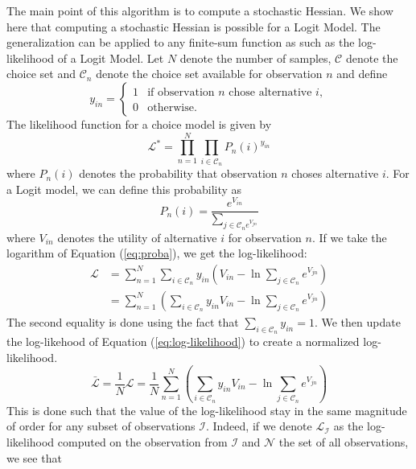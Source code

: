 \documentclass[conference]{IEEEtran}
\begin{document}
The main point of this algorithm is to compute a stochastic Hessian. We show here that computing a stochastic Hessian is possible for a Logit Model. The generalization can be applied to any finite-sum function as such as the log-likelihood of a Logit Model. Let $N$ denote the number of samples, $\mathcal{C}$ denote the choice set and $\mathcal{C}_n$ denote the choice set available for observation $n$ and define
\[
y_{in} = 
\begin{cases}
1 & \text{if observation $n$ chose alternative $i$}, \\
0 & \text{otherwise}.
\end{cases}
\]
The likelihood function for a choice model is given by
\begin{equation}
\mathcal{L}^* = \prod_{n=1}^N \prod_{i\in\mathcal{C}_n} P_n(i)^{y_{in}}
\end{equation}
where $P_n(i)$ denotes the probability that observation $n$ choses alternative $i$. For a Logit model, we can define this probability as
\begin{equation}
\label{eq:proba}
P_n(i) = \frac{e^{V_{in}}}{\sum_{j\in\mathcal{C}_n e^{V_{jn}}}}
\end{equation}
where $V_{in}$ denotes the utility of alternative $i$ for observation $n$. If we take the logarithm of Equation (\ref{eq:proba}), we get the log-likelihood:
\begin{align}
\label{eq:log-likelihood}
\mathcal{L} &= \sum_{n=1}^N\sum_{i\in\mathcal{C}_n} y_{in}\left( V_{in} - \ln \sum_{j\in\mathcal{C}_n}e^{V_{jn}} \right) \nonumber \\
&= \sum_{n=1}^N \left( \sum_{i\in\mathcal{C}_n} y_{in}V_{in} - \ln \sum_{j\in\mathcal{C}_n}e^{V_{jn}} \right) 
\end{align}
The second equality is done using the fact that $\sum_{i\in\mathcal{C}_n} y_{in} = 1$. We then update the log-likehood of Equation (\ref{eq:log-likelihood}) to create a normalized log-likelihood.
\begin{equation}
\label{eq:norm_ll}
\bar{\mathcal{L}} = \frac{1}{N}\mathcal{L} = \frac{1}{N} \sum_{n=1}^N \left( \sum_{i\in\mathcal{C}_n} y_{in}V_{in} - \ln \sum_{j\in\mathcal{C}_n}e^{V_{jn}} \right)
\end{equation}
This is done such that the value of the log-likelihood stay in the same magnitude of order for any subset of observations $\mathcal{I}$. Indeed, if we denote $\mathcal{L}_{\mathcal{I}}$ as the log-likelihood computed on the observation from $\mathcal{I}$ and $\mathcal{N}$ the set of all observations, we see that
\end{document}
